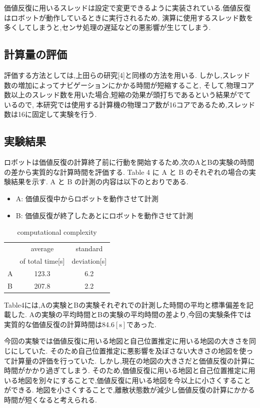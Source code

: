 \documentclass{jarticle}
\begin{document}
価値反復に用いるスレッドは設定で変更できるように実装されている.価値反復はロボットが動作しているときに実行されるため,
演算に使用するスレッド数を多くしてしまうと,センサ処理の遅延などの悪影響が生じてしまう.


\subsection{計算量の評価}
評価する方法としては,上田らの研究[4]と同様の方法を用いる.
しかし,スレッド数の増加によってナビゲーションにかかる時間が短縮すること,
そして,物理コア数以上のスレッド数を用いた場合,短縮の効果が頭打ちであるという結果がでているので,
本研究では使用する計算機の物理コア数が16コアであるため,スレッド数は16に固定して実験を行う.
\subsection{実験結果}
ロボットは価値反復の計算終了前に行動を開始するため,次のAとBの実験の時間の差から実質的な計算時間を評価する.
Table 4 に A と B のそれぞれの場合の実験結果を示す.
A と B の計測の内容は以下のとおりである.

\begin{itemize}
	\item A: 価値反復中からロボットを動作させて計測
	\item B: 価値反復が終了したあとにロボットを動作させて計測
\end{itemize}

\begin{table}[hbtp]
	\caption{computational complexity}
	\centering
	 \begin{tabular}{l|cc}
		\hline
		 & average & standard \\
		 & of total time[s] & deviation[s] \\
		\hline \hline
		A & 123.3 & 6.2 \\
		B & 207.8 & 2.2 \\
		\hline
	 \end{tabular}
 \end{table}

Table4には,Aの実験とBの実験それぞれでの計測した時間の平均と標準偏差を記載した.
Aの実験の平均時間とBの実験の平均時間の差より,今回の実験条件では実質的な価値反復の計算時間は84.6$\mathrm{[s]}$であった.

今回の実験では価値反復に用いる地図と自己位置推定に用いる地図の大きさを同じにしていた.
そのため自己位置推定に悪影響を及ぼさない大きさの地図を使って計算量の評価を行っていた.
しかし,現在の地図の大きさだと価値反復の計算に時間がかかり過ぎてしまう.
そのため,価値反復に用いる地図と自己位置推定に用いる地図を別々にすることで,価値反復に用いる地図を今以上に小さくすることができる.
地図を小さくすることで,離散状態数が減少し価値反復の計算にかかる時間が短くなると考えられる.
\end{document}
